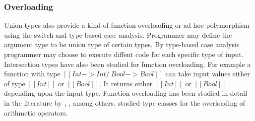 \subsubsection*{Overloading}
Union types also provide a kind of function overloading or ad-hoc
polymorphism using the switch and type-based case analysis. Programmer
may define the argument type to be union type of certain types. By
type-based case analysis programmer may choose to execute diffent code
for each specific type of input.  Intersection types have also been
studied for function overloading. For example a function with type
$[[Int -> Int /\ Bool -> Bool]]$ can take input values either of type
$[[Int]]$ or $[[Bool]]$.  It returns either $[[Int]]$ or $[[Bool]]$
depending upon the input type.  Function overloading has been studied
in detail in the literature by \cite{castagna1995calculus},
\cite{cardelli1985understanding}, \cite{stuckey2005theory} among
others.  \citet{wadler1989make} studied type classes for the
overloading of arithmetic operators.
